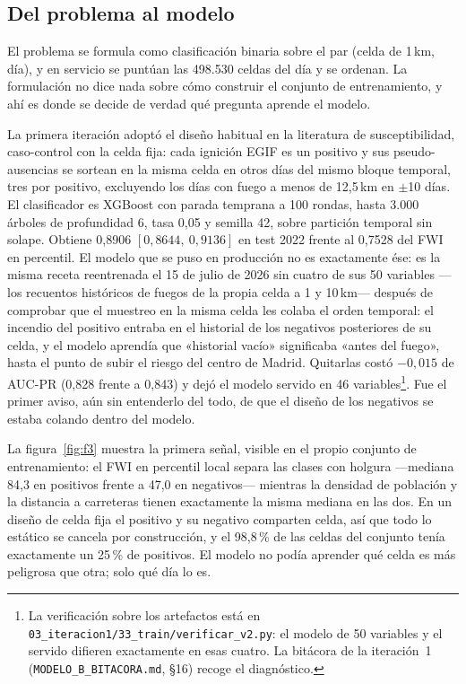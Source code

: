 \documentclass[10pt,a4paper]{article}
\begin{document}
\subsection{Del problema al modelo}

El problema se formula como clasificación binaria sobre el par (celda de 1\,km,
día), y en servicio se puntúan las 498.530 celdas del día y se ordenan. La
formulación no dice nada sobre cómo construir el conjunto de entrenamiento, y ahí
es donde se decide de verdad qué pregunta aprende el modelo.

La primera iteración adoptó el diseño habitual en la literatura de
susceptibilidad, caso-control con la celda fija: cada ignición EGIF es un
positivo y sus pseudo-ausencias se sortean en la misma celda en otros días del
mismo bloque temporal, tres por positivo, excluyendo los días con fuego a menos
de 12,5\,km en $\pm$10 días. El clasificador es XGBoost con parada temprana a
100 rondas, hasta 3.000 árboles de profundidad 6, tasa 0,05 y semilla 42, sobre
partición temporal sin solape. Obtiene 0,8906
$[0,8644,\ 0,9136]$ en test 2022 frente al 0,7528 del FWI en percentil. El
modelo que se puso en producción no es exactamente ése: es la misma receta
reentrenada el 15 de julio de 2026 sin cuatro de sus 50 variables ---los
recuentos históricos de fuegos de la propia celda a 1 y 10\,km--- después de
comprobar que el muestreo en la misma celda les colaba el orden temporal: el
incendio del positivo entraba en el historial de los negativos posteriores de su
celda, y el modelo aprendía que «historial vacío» significaba «antes del
fuego», hasta el punto de subir el riesgo del centro de Madrid. Quitarlas costó
$-0,015$ de AUC-PR (0,828 frente a 0,843) y dejó el modelo servido en 46
variables\footnote{La verificación sobre los artefactos está en
\texttt{03\_iteracion1/33\_train/verificar\_v2.py}: el modelo de 50 variables
y el servido difieren exactamente en esas cuatro. La bitácora de la
iteración~1 (\texttt{MODELO\_B\_BITACORA.md}, §16) recoge el diagnóstico.}.
Fue el primer aviso, aún sin entenderlo del todo, de que el diseño de los
negativos se estaba colando dentro del modelo.

La figura~\ref{fig:f3} muestra la primera señal, visible en el propio conjunto
de entrenamiento: el FWI en percentil local separa las clases con holgura
---mediana 84,3 en positivos frente a 47,0 en negativos--- mientras la densidad
de población y la distancia a carreteras tienen exactamente la misma mediana en
las dos. En un diseño de celda fija el positivo y su negativo comparten celda,
así que todo lo estático se cancela por construcción, y el 98,8\,\% de las celdas
del conjunto tenía exactamente un 25\,\% de positivos. El modelo no podía
aprender qué celda es más peligrosa que otra; solo qué día lo es.
\end{document}
